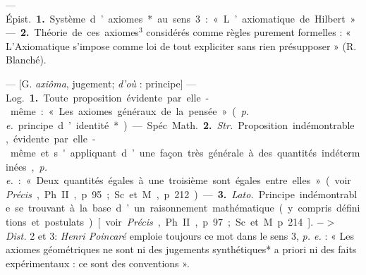 \begin{itemize}[leftmargin=1cm, label=, itemsep=1pt]
 — \si{Épist.} {\bf 1.} Système
d’axiomes* au sens 3 : « L’axiomatique de Hilbert ». — {\bf 2.} Théorie de
ces axiomes$^3$ considérés comme
règles purement formelles : « L’Axiomatique s'impose comme loi de tout
expliciter sans rien présupposer »
(R. Blanché).

 — [G. {\it axiôma}, jugement; {\it d'où} :
principe] — \si{Log.} {\bf 1.} Toute proposition évidente par elle-même : « Les
axiomes généraux de la pensée » ({\it p. e.}
principe d’identité*).

— Spéc. \si{Math.} {\bf 2.} {\it Str.} Proposition indémontrable, évidente par
elle-même et s'appliquant d’une
façon très générale à des quantités
indéterminées, {\it p. e.} : « Deux quantités
égales à une troisième sont égales
entre elles » (voir {\it Précis}, Ph. II,
p. 95; Sc. et M., p. 212). — {\bf 3.} {\it Lato.}
Principe indémontrable se trouvant
à la base d’un raisonnement mathématique (y compris définitions et
postulats) [voir {\it Précis}, Ph. II, p. 97;
Sc. et M. p. 214]. $->$ {\it Dist.} 2 et 3:
{\it Henri Poincaré} emploie toujours
ce mot dans le sens 3, {\it p. e.} : « Les
axiomes géométriques ne sont ni des
jugements synthétiques* a priori ni
des faits expérimentaux : ce sont
des conventions ».
	\end{itemize}
